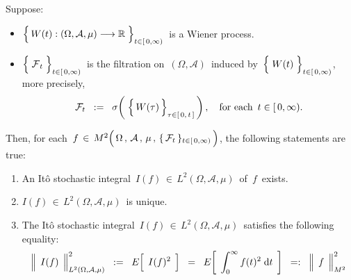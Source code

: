
\vskip 0.5cm
\begin{theorem}
\mbox{}
\vskip 0.2cm
\noindent
Suppose:
\begin{itemize}
\item
	$\left\{\,\overset{{\color{white}.}}{W}(t) : (\Omega,\mathcal{A},\mu) \longrightarrow \Re \;\right\}_{t \in[\,0,\infty)}$\,
	is a Wiener process.
\item
	$\left\{\;\overset{{\color{white}.}}{\mathcal{F}}_{t}\;\right\}_{t\in[\,0,\infty)}$\,
	is the filtration on \,$(\Omega,\mathcal{A})$\, induced by
	\,$\left\{\;\overset{{\color{white}.}}{W}(t)\;\right\}_{t\in[\,0,\infty)}$,\,
	more precisely,
	\begin{equation*}
	\mathcal{F}_{t}
	\;\; := \;\;
		\sigma\!\left(\;\left\{\,\overset{{\color{white}.}}{W}(\tau)\,\right\}_{\tau\in[\,0,\,t\,]}\,\right),
	\quad
	\textnormal{for each \,$t \in [\,0,\infty)$}.
	\end{equation*}
\end{itemize}
Then, for each 
\,$f \,\in\, M^{2}\!
	\left(\,
		\overset{{\color{white}.}}{\Omega} \,,\, \mathcal{A} \,,\, \mu \,,\, \{\,\mathcal{F}_{t}\,\}_{t \in [\,0,\infty)}
		\,\right)$,
the following statements are true:
\begin{enumerate}
\item
	An It\^{o} stochastic integral \,$I(f) \,\in\, L^{2}(\Omega,\mathcal{A},\mu)$\, of \,$f$\, exists.
\item
	$I(f) \,\in\, L^{2}(\Omega,\mathcal{A},\mu)$\, is unique.
\item
	The It\^{o} stochastic integral \,$I(f) \,\in\, L^{2}(\Omega,\mathcal{A},\mu)$\, satisfies the following equality:
	\begin{equation*}
	\left\Vert\;\, \overset{{\color{white}.}}{I(f)} \,\;\right\Vert_{L^{2}(\Omega,\mathcal{A},\mu)}^{2}
	\;\; := \;\;
		E\!\left[\;\, \overset{{\color{white}.}}{I(f)^{2}} \,\;\right]
	\;\; = \;\;
		E\!\left[\;\,
			\int_{0}^{\infty} f(t)^{2} \;\d t
			\,\;\right]
	\;\; =: \;\;
		\left\Vert\;\, \overset{{\color{white}.}}{f} \,\;\right\Vert_{M^{2}}^{2}
	\end{equation*}
\end{enumerate}
\end{theorem}
\proof
